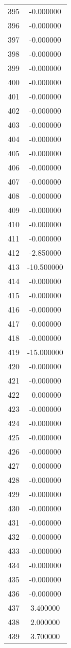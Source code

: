 \documentclass[12pt]{article}
\begin{document}
\begin{longtable}{@{}cc@{}}
395 & -0.000000 \\
396 & -0.000000 \\
397 & -0.000000 \\
398 & -0.000000 \\
399 & -0.000000 \\
400 & -0.000000 \\
401 & -0.000000 \\
402 & -0.000000 \\
403 & -0.000000 \\
404 & -0.000000 \\
405 & -0.000000 \\
406 & -0.000000 \\
407 & -0.000000 \\
408 & -0.000000 \\
409 & -0.000000 \\
410 & -0.000000 \\
411 & -0.000000 \\
412 & -2.850000 \\
413 & -10.500000 \\
414 & -0.000000 \\
415 & -0.000000 \\
416 & -0.000000 \\
417 & -0.000000 \\
418 & -0.000000 \\
419 & -15.000000 \\
420 & -0.000000 \\
421 & -0.000000 \\
422 & -0.000000 \\
423 & -0.000000 \\
424 & -0.000000 \\
425 & -0.000000 \\
426 & -0.000000 \\
427 & -0.000000 \\
428 & -0.000000 \\
429 & -0.000000 \\
430 & -0.000000 \\
431 & -0.000000 \\
432 & -0.000000 \\
433 & -0.000000 \\
434 & -0.000000 \\
435 & -0.000000 \\
436 & -0.000000 \\
437 & 3.400000 \\
438 & 2.000000 \\
439 & 3.700000 \\

\end{longtable}
\end{document}
